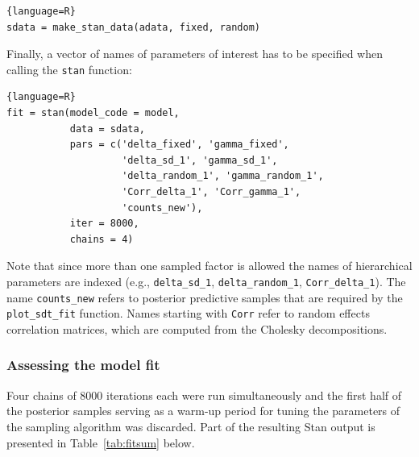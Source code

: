 \documentclass[oneside,a4paper]{article}
\begin{document}
\begin{lstlisting}{language=R}
sdata = make_stan_data(adata, fixed, random)
\end{lstlisting}

Finally, a vector of names of parameters of interest has to be
specified when calling the \texttt{stan} function:

\begin{lstlisting}{language=R}
fit = stan(model_code = model,
           data = sdata,
           pars = c('delta_fixed', 'gamma_fixed',
                    'delta_sd_1', 'gamma_sd_1',
                    'delta_random_1', 'gamma_random_1',
                    'Corr_delta_1', 'Corr_gamma_1',
                    'counts_new'),
           iter = 8000,
           chains = 4)
\end{lstlisting}

Note that since more than one sampled factor is allowed the names of
hierarchical parameters are indexed (e.g., \texttt{delta\_sd\_1},
\texttt{delta\_random\_1}, \texttt{Corr\_delta\_1}). The name
\texttt{counts\_new} refers to posterior predictive samples that are
required by the \texttt{plot\_sdt\_fit} function.
Names starting with \texttt{Corr} refer to random effects correlation
matrices, which are computed from the Cholesky decompositions.

\subsubsection{Assessing the model fit}

Four chains of 8000 iterations each were run simultaneously and the
first half of the posterior samples serving as a warm-up period for
tuning the parameters of the sampling algorithm was discarded. Part of
the resulting Stan output is presented in Table~\ref{tab:fitsum}
below.
\end{document}
